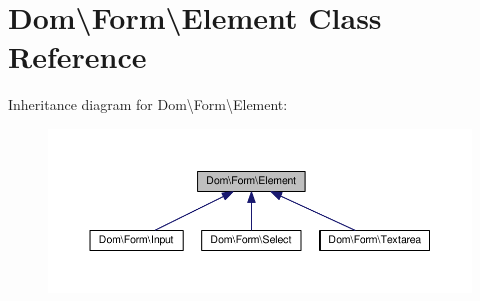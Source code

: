 \hypertarget{classDom_1_1Form_1_1Element}{\section{Dom\textbackslash{}Form\textbackslash{}Element Class Reference}
\label{classDom_1_1Form_1_1Element}
}


Inheritance diagram for Dom\textbackslash{}Form\textbackslash{}Element\+:\nopagebreak
\begin{figure}[H]
\begin{center}
\leavevmode
\includegraphics[width=350pt]{classDom_1_1Form_1_1Element__inherit__graph}
\end{center}
\end{figure}
